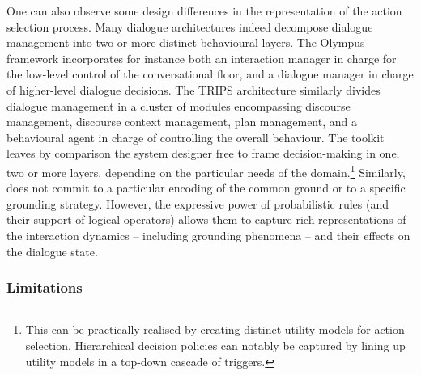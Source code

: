 One can also observe some design differences in the representation of the action selection process. Many dialogue architectures indeed decompose dialogue management into two or more distinct behavioural layers.  The Olympus framework incorporates for instance both an interaction manager in charge for the low-level control of the conversational floor, and a dialogue manager in charge of higher-level dialogue decisions.  The TRIPS architecture similarly divides dialogue management in a cluster of modules encompassing discourse management, discourse context management, plan management, and a behavioural agent in charge of controlling the overall behaviour. The \opendial{} toolkit leaves by comparison the system designer free to frame decision-making in one, two or more layers, depending on the particular needs of the domain.\footnote{This can be practically realised by creating distinct utility models for action selection.  Hierarchical decision policies can notably be captured by lining up utility models in a top-down cascade of triggers.} Similarly, \opendial{} does not commit to a particular encoding of the common ground or to a specific grounding strategy.  However, the expressive power of probabilistic rules (and their support of logical operators) allows them to capture rich representations of the interaction dynamics -- including grounding phenomena -- and their effects on the dialogue state. 



\subsubsection*{Limitations}

